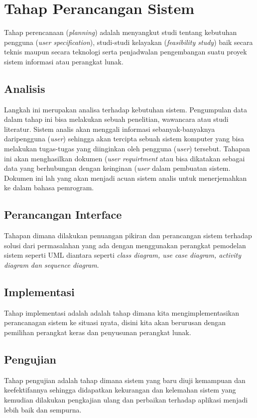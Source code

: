 \section{Tahap Perancangan Sistem}
Tahap perencanaan (\textit{planning}) adalah menyangkut studi tentang kebutuhan pengguna (\textit{user specification}), studi-studi kelayakan (\textit{feasibility study}) baik secara teknis maupun secara teknologi serta penjadwalan pengembangan suatu proyek sistem informasi atau perangkat lunak.

\subsection{ Analisis}
Langkah ini merupakan analisa terhadap kebutuhan sistem. Pengumpulan data dalam tahap ini bisa melakukan sebuah penelitian, wawancara atau studi literatur. Sistem analis akan menggali informasi sebanyak-banyaknya daripengguna (\textit{user}) sehingga akan tercipta sebuah sistem komputer yang bisa melakukan tugas-tugas yang diinginkan oleh pengguna (\textit{user}) tersebut. Tahapan ini akan menghasilkan dokumen (\textit{user requirtment} atau bisa dikatakan sebagai data yang berhubungan dengan keinginan (\textit{user} dalam pembuatan sistem. Dokumen ini lah yang akan menjadi acuan sistem analis untuk menerjemahkan ke dalam bahasa pemrogram.
\subsection{ Perancangan Interface}
Tahapan dimana dilakukan penuangan pikiran dan perancangan sistem terhadap solusi dari permasalahan yang ada dengan menggunakan perangkat pemodelan sistem seperti UML diantara seperti \textit{class diagram, use case diagram, activity diagram dan sequence diagram}.
\subsection{ Implementasi}
Tahap implementasi adalah adalah tahap dimana kita mengimplementasikan perancanagan sistem ke situasi nyata, disini kita akan berurusan dengan pemilihan perangkat keras dan penyusunan perangkat lunak.

\subsection{ Pengujian}
Tahap pengujian adalah tahap dimana sistem yang baru diuji kemampuan dan keefektifannya sehingga didapatkan kekurangan dan kelemahan sistem yang kemudian dilakukan pengkajian ulang dan perbaikan terhadap aplikasi menjadi lebih baik dan sempurna.

